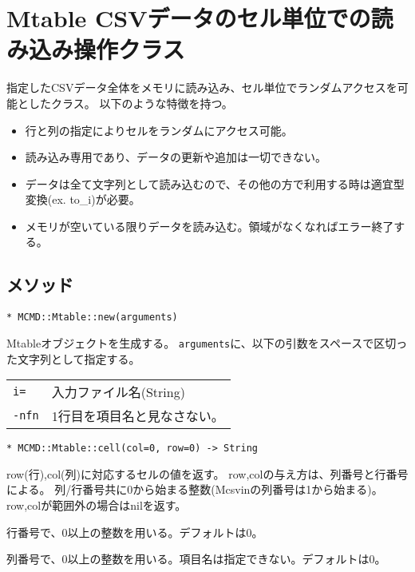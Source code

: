 
%

\section{Mtable CSVデータのセル単位での読み込み操作クラス\label{sect:mtableRB}}
指定したCSVデータ全体をメモリに読み込み、セル単位でランダムアクセスを可能としたクラス。
以下のような特徴を持つ。
\begin{itemize}
\setlength{\itemindent}{0mm}
\item 行と列の指定によりセルをランダムにアクセス可能。
\item 読み込み専用であり、データの更新や追加は一切できない。
\item データは全て文字列として読み込むので、その他の方で利用する時は適宜型変換(ex. to\_i)が必要。
\item メモリが空いている限りデータを読み込む。領域がなくなればエラー終了する。
\end{itemize}

\subsection{メソッド}

{\Large
\begin{verbatim}
* MCMD::Mtable::new(arguments)
\end{verbatim}
}

Mtableオブジェクトを生成する。
\verb|arguments|に、以下の引数をスペースで区切った文字列として指定する。

\begin{table}[htbp]
\begin{tabular}{ll}
\verb|i=|    & 入力ファイル名(String)\\
\verb|-nfn|  & 1行目を項目名と見なさない。\\
\end{tabular} 
\end{table} 

{\Large
\begin{verbatim}
* MCMD::Mtable::cell(col=0, row=0) -> String
\end{verbatim}
}

row(行),col(列)に対応するセルの値を返す。
row,colの与え方は、列番号と行番号による。
列/行番号共に0から始まる整数(Mcsvinの列番号は1から始まる)。
row,colが範囲外の場合はnilを返す。

\begin{description}
\setlength{\itemindent}{0mm}
\item[row ] 行番号で、0以上の整数を用いる。デフォルトは0。
\item[col ] 列番号で、0以上の整数を用いる。項目名は指定できない。デフォルトは0。
\end{description}

